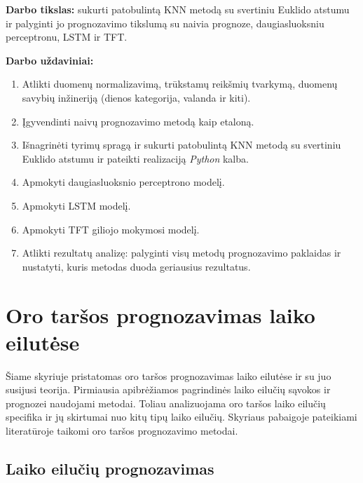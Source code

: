 \documentclass[]{VUMIFTemplateClass}
\begin{document}
    \textbf{Darbo tikslas:} sukurti patobulintą KNN metodą su svertiniu Euklido atstumu ir palyginti jo  prognozavimo tikslumą su naivia prognoze, daugiasluoksniu perceptronu, LSTM ir TFT.

    \textbf{Darbo uždaviniai:}
    \begin{enumerate}
        \item Atlikti duomenų normalizavimą, trūkstamų reikšmių tvarkymą, duomenų savybių inžineriją (dienos kategorija, valanda ir kiti).
        \item Įgyvendinti naivų prognozavimo metodą kaip etaloną.
        \item Išnagrinėti tyrimų spragą ir sukurti patobulintą KNN metodą su svertiniu Euklido atstumu ir pateikti realizaciją \textit{Python} kalba.
        \item Apmokyti daugiasluoksnio perceptrono modelį.
        \item Apmokyti LSTM modelį.
        \item Apmokyti TFT giliojo mokymosi modelį.
        \item Atlikti rezultatų analizę: palyginti visų metodų prognozavimo paklaidas ir nustatyti, kuris metodas duoda geriausius rezultatus.
    \end{enumerate}



    \section{Oro taršos prognozavimas laiko eilutėse}

    Šiame skyriuje pristatomas oro taršos prognozavimas laiko eilutėse ir su juo susijusi teorija.
    Pirmiausia apibrėžiamos pagrindinės laiko eilučių sąvokos ir prognozei naudojami metodai.
    Toliau analizuojama oro taršos laiko eilučių specifika ir jų skirtumai nuo kitų tipų laiko eilučių.
    Skyriaus pabaigoje pateikiami literatūroje taikomi oro taršos prognozavimo metodai.

    \subsection{Laiko eilučių prognozavimas}
\end{document}
